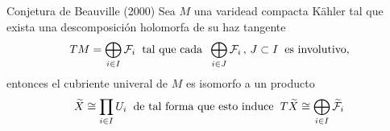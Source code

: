 \documentclass[letterpaper]{beamer}
\begin{document}
\begin{frame}
\begin{block}{Conjetura de Beauville (2000)}\label{Beauville}
        Sea $M$ una varidead compacta K\"ahler tal que exista una descomposici\'on holomorfa de su haz tangente
        \[
        TM=\bigoplus_{i\in I}\mathcal{F}_i\hspace{0.2cm}\text{tal que cada}\hspace{0.2cm}\bigoplus_{i\in J}\mathcal{F}_i\,,\,J\subset I\hspace{0.2cm}\text{es involutivo},
        \]
        entonces el cubriente univeral de $M$ es isomorfo a un producto
        \[
        \widetilde{X}\cong\prod_{i\in I}U_i\hspace{0.2cm}\text{de tal forma que esto induce}\hspace{0.2cm}T\widetilde{X}\cong\bigoplus_{i\in I}\widetilde{\mathcal{F}}_i
        \]
      \end{block}
\end{frame}
\end{document}
